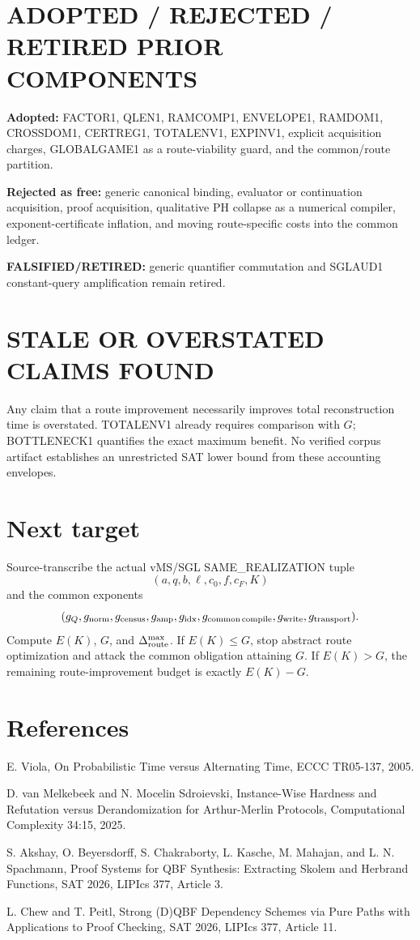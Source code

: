 \documentclass[11pt]{article}
\begin{document}
\section*{ADOPTED / REJECTED / RETIRED PRIOR COMPONENTS}
\textbf{Adopted:} FACTOR1, QLEN1, RAMCOMP1, ENVELOPE1, RAMDOM1, CROSSDOM1, CERTREG1, TOTALENV1, EXPINV1, explicit acquisition charges, GLOBALGAME1 as a route-viability guard, and the common/route partition.

\textbf{Rejected as free:} generic canonical binding, evaluator or continuation acquisition, proof acquisition, qualitative PH collapse as a numerical compiler, exponent-certificate inflation, and moving route-specific costs into the common ledger.

\textbf{FALSIFIED/RETIRED:} generic quantifier commutation and SGLAUD1 constant-query amplification remain retired.

\section*{STALE OR OVERSTATED CLAIMS FOUND}
Any claim that a route improvement necessarily improves total reconstruction time is overstated. TOTALENV1 already requires comparison with \(G\); BOTTLENECK1 quantifies the exact maximum benefit. No verified corpus artifact establishes an unrestricted SAT lower bound from these accounting envelopes.

\section*{Next target}
Source-transcribe the actual vMS/SGL SAME\_REALIZATION tuple
\[
(a,q,b,\ell,c_0,f,c_F,K)
\]
and the common exponents
\[
(g_Q,g_{\rm norm},g_{\rm census},g_{\rm amp},g_{\rm idx},
g_{\rm common\,compile},g_{\rm write},g_{\rm transport}).
\]
Compute \(E(K)\), \(G\), and \(\Delta_{\rm route}^{\max}\). If \(E(K)\le G\), stop abstract route optimization and attack the common obligation attaining \(G\). If \(E(K)>G\), the remaining route-improvement budget is exactly \(E(K)-G\).

\section*{References}
E. Viola, On Probabilistic Time versus Alternating Time, ECCC TR05-137, 2005.

D. van Melkebeek and N. Mocelin Sdroievski, Instance-Wise Hardness and Refutation versus Derandomization for Arthur-Merlin Protocols, Computational Complexity 34:15, 2025.

S. Akshay, O. Beyersdorff, S. Chakraborty, L. Kasche, M. Mahajan, and L. N. Spachmann, Proof Systems for QBF Synthesis: Extracting Skolem and Herbrand Functions, SAT 2026, LIPIcs 377, Article 3.

L. Chew and T. Peitl, Strong (D)QBF Dependency Schemes via Pure Paths with Applications to Proof Checking, SAT 2026, LIPIcs 377, Article 11.
\end{document}
